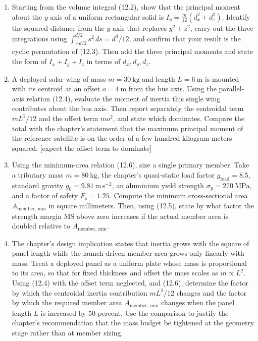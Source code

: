 \documentclass[
  11pt,
  openany,
  oneside]{book}
\begin{document}
\begin{enumerate}
\def\labelenumi{\arabic{enumi}.}
\item
  Starting from the volume integral (12.2), show that the principal
  moment about the \(y\) axis of a uniform rectangular solid is
  \(I_y = \tfrac{m}{12}(d_x^2 + d_z^2)\). Identify the squared distance
  from the \(y\) axis that replaces \(y^2 + z^2\), carry out the three
  integrations using \(\int_{-d/2}^{d/2} s^2\,ds = d^3/12\), and confirm
  that your result is the cyclic permutation of (12.3). Then add the
  three principal moments and state the form of \(I_x + I_y + I_z\) in
  terms of \(d_x, d_y, d_z\).
\item
  A deployed solar wing of mass \(m = 30\ \mathrm{kg}\) and length
  \(L = 6\ \mathrm{m}\) is mounted with its centroid at an offset
  \(o = 4\ \mathrm{m}\) from the bus axis. Using the parallel-axis
  relation (12.4), evaluate the moment of inertia this single wing
  contributes about the bus axis. Then report separately the centroidal
  term \(mL^2/12\) and the offset term \(mo^2\), and state which
  dominates. Compare the total with the chapter's statement that the
  maximum principal moment of the reference satellite is on the order of
  a few hundred kilogram-meters squared. {[}expect the offset term to
  dominate{]}
\item
  Using the minimum-area relation (12.6), size a single primary member.
  Take a tributary mass \(m = 80\ \mathrm{kg}\), the chapter's
  quasi-static load factor \(g_{\mathrm{load}} = 8.5\), standard gravity
  \(g_0 = 9.81\ \mathrm{m\,s^{-2}}\), an aluminium yield strength
  \(\sigma_y = 270\ \mathrm{MPa}\), and a factor of safety
  \(F_s = 1.25\). Compute the minimum cross-sectional area
  \(A_{\mathrm{member,\,min}}\) in square millimeters. Then, using
  (12.5), state by what factor the strength margin \(\mathrm{MS}\) above
  zero increases if the actual member area is doubled relative to
  \(A_{\mathrm{member,\,min}}\).
\item
  The chapter's design implication states that inertia grows with the
  square of panel length while the launch-driven member area grows only
  linearly with mass. Treat a deployed panel as a uniform plate whose
  mass is proportional to its area, so that for fixed thickness and
  offset the mass scales as \(m \propto L^2\). Using (12.4) with the
  offset term neglected, and (12.6), determine the factor by which the
  centroidal inertia contribution \(mL^2/12\) changes and the factor by
  which the required member area \(A_{\mathrm{member,\,min}}\) changes
  when the panel length \(L\) is increased by 50 percent. Use the
  comparison to justify the chapter's recommendation that the mass
  budget be tightened at the geometry stage rather than at member
  sizing.
\end{enumerate}
\end{document}
